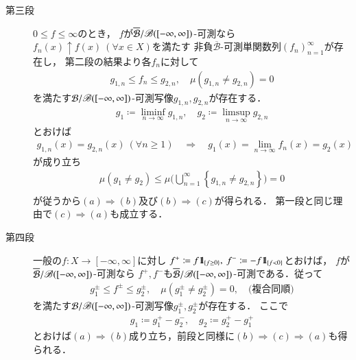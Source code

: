 \begin{prf}
\begin{description}
				\item[第三段]
					$0 \leq f \leq \infty$のとき，
					$f$が$\overline{\mathcal{B}}/\mathscr{B}([-\infty,\infty])$-可測なら
					$f_n(x) \uparrow f(x)\ (\forall x \in X)$を満たす
					非負$\overline{\mathcal{B}}$-可測単関数列$(f_n)_{n=1}^\infty$が存在し，
					第二段の結果より各$f_n$に対して
					\begin{align}
						g_{1,n} \leq f_n \leq g_{2,n},
						\quad \mu\left( g_{1,n} \neq g_{2,n} \right)=0
					\end{align}
					を満たす$\mathcal{B}/\mathscr{B}([-\infty,\infty])$-可測写像$g_{1,n},g_{2,n}$が存在する．
					\begin{align}
						g_1 \coloneqq \liminf_{n \to \infty} g_{1,n},
						\quad g_2 \coloneqq \limsup_{n \to \infty} g_{2,n}
					\end{align}
					とおけば
					\begin{align}
						g_{1,n}(x) = g_{2,n}(x)\ (\forall n \geq 1)
						\quad \Rightarrow \quad g_1(x) = \lim_{n \to \infty} f_n(x) = g_2(x)
					\end{align}
					が成り立ち
					\begin{align}
						\mu(g_1 \neq g_2)
						\leq \mu\Biggl( \bigcup_{n=1}^\infty \left\{g_{1,n} \neq g_{2,n}\right\} \Biggr)=0 \\
					\end{align}
					が従うから$(a) \Rightarrow (b)$及び$(b) \Rightarrow (c)$が得られる．
					第一段と同じ理由で$(c) \Rightarrow (a)$も成立する．
					
				\item[第四段]
					一般の$f:X \longrightarrow [-\infty,\infty]$に対し
					$f^+ \coloneqq f \mbox{1}\hspace{-0.25em}\mbox{l}_{\{f \geq 0\}},\ f^- \coloneqq -f \mbox{1}\hspace{-0.25em}\mbox{l}_{\{f < 0\}}$とおけば，
					$f$が$\overline{\mathcal{B}}/\mathscr{B}([-\infty,\infty])$-可測なら
					$f^+,f^-$も$\overline{\mathcal{B}}/\mathscr{B}([-\infty,\infty])$-可測である．従って
					\begin{align}
						g_1^\pm \leq f^\pm \leq g_2^\pm, \quad \mu\left( g_1^\pm \neq g_2^\pm \right) = 0,
						\quad \mbox{(複合同順)}
					\end{align}
					を満たす$\mathcal{B}/\mathscr{B}([-\infty,\infty])$-可測写像$g_1^{\pm},g_2^{\pm}$が存在する．
					ここで
					\begin{align}
						g_1 \coloneqq g_1^+ - g_2^-,
						\quad g_2 \coloneqq g_2^+ - g_1^+
					\end{align}
					とおけば$(a) \Rightarrow (b)$成り立ち，前段と同様に$(b) \Rightarrow (c) \Rightarrow (a)$も得られる．
					\QED
			\end{description}
		\end{prf}
		
